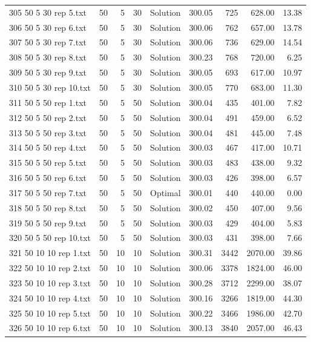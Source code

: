 \begin{longtable}{lrrllrrrr}
305 50 5 30 rep 5.txt & 50 & 5 & 30 & Solution & 300.05 & 725 & 628.00 & 13.38\\
306 50 5 30 rep 6.txt & 50 & 5 & 30 & Solution & 300.06 & 762 & 657.00 & 13.78\\
307 50 5 30 rep 7.txt & 50 & 5 & 30 & Solution & 300.06 & 736 & 629.00 & 14.54\\
308 50 5 30 rep 8.txt & 50 & 5 & 30 & Solution & 300.23 & 768 & 720.00 &  6.25\\
309 50 5 30 rep 9.txt & 50 & 5 & 30 & Solution & 300.05 & 693 & 617.00 & 10.97\\
310 50 5 30 rep 10.txt & 50 & 5 & 30 & Solution & 300.05 & 770 & 683.00 & 11.30\\
311 50 5 50 rep 1.txt & 50 & 5 & 50 & Solution & 300.04 & 435 & 401.00 &  7.82\\
312 50 5 50 rep 2.txt & 50 & 5 & 50 & Solution & 300.04 & 491 & 459.00 &  6.52\\
313 50 5 50 rep 3.txt & 50 & 5 & 50 & Solution & 300.04 & 481 & 445.00 &  7.48\\
314 50 5 50 rep 4.txt & 50 & 5 & 50 & Solution & 300.03 & 467 & 417.00 & 10.71\\
315 50 5 50 rep 5.txt & 50 & 5 & 50 & Solution & 300.03 & 483 & 438.00 &  9.32\\
316 50 5 50 rep 6.txt & 50 & 5 & 50 & Solution & 300.03 & 426 & 398.00 &  6.57\\
317 50 5 50 rep 7.txt & 50 & 5 & 50 & Optimal & 300.01 & 440 & 440.00 &  0.00\\
318 50 5 50 rep 8.txt & 50 & 5 & 50 & Solution & 300.02 & 450 & 407.00 &  9.56\\
319 50 5 50 rep 9.txt & 50 & 5 & 50 & Solution & 300.03 & 429 & 404.00 &  5.83\\
320 50 5 50 rep 10.txt & 50 & 5 & 50 & Solution & 300.03 & 431 & 398.00 &  7.66\\
321 50 10 10 rep 1.txt & 50 & 10 & 10 & Solution & 300.31 & 3442 & 2070.00 & 39.86\\
322 50 10 10 rep 2.txt & 50 & 10 & 10 & Solution & 300.06 & 3378 & 1824.00 & 46.00\\
323 50 10 10 rep 3.txt & 50 & 10 & 10 & Solution & 300.28 & 3712 & 2299.00 & 38.07\\
324 50 10 10 rep 4.txt & 50 & 10 & 10 & Solution & 300.16 & 3266 & 1819.00 & 44.30\\
325 50 10 10 rep 5.txt & 50 & 10 & 10 & Solution & 300.22 & 3466 & 1986.00 & 42.70\\
326 50 10 10 rep 6.txt & 50 & 10 & 10 & Solution & 300.13 & 3840 & 2057.00 & 46.43\\

\end{longtable}
